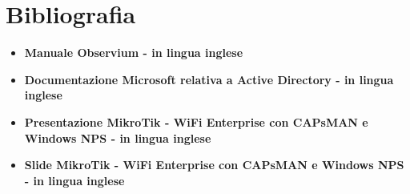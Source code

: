 \documentclass[Tesi.tex]{subfiles}
\begin{document}
\renewcommand{\leftmark}{Bibliografia}

\chapter*{Bibliografia}

\begin{itemize}
	\item \textbf{Manuale Observium - in lingua inglese}\\
	\item \textbf{Documentazione Microsoft relativa a Active Directory - in lingua inglese}\\
	\item \textbf{Presentazione MikroTik - WiFi Enterprise con CAPsMAN e Windows NPS - in lingua inglese}\\
	\item \textbf{Slide MikroTik - WiFi Enterprise con CAPsMAN e Windows NPS - in lingua inglese}\\
	
	
\end{itemize}
\end{document}
